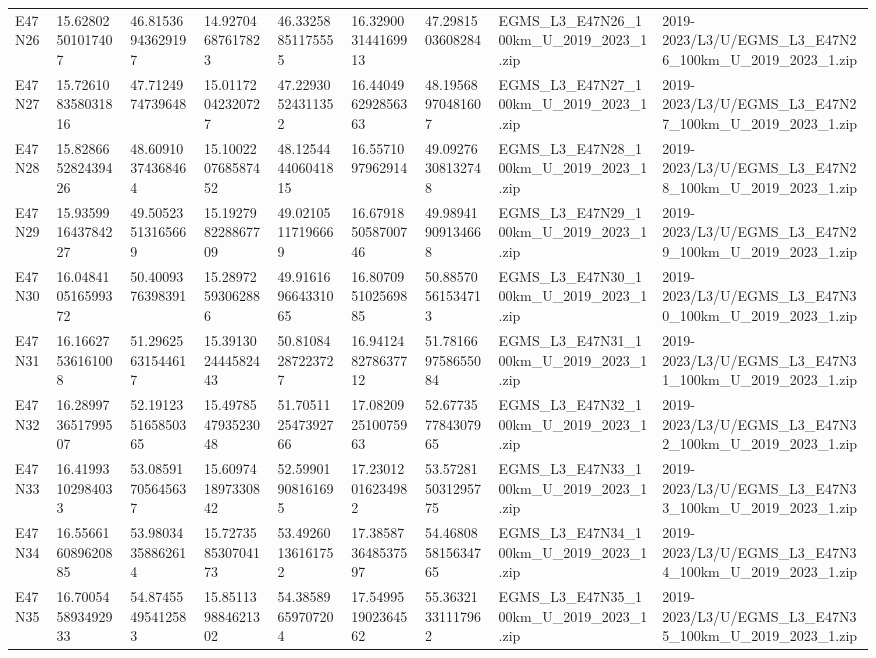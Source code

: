 \begin{landscape}
\begin{longtable}{lllllllll}
E47N26 & 15.62802501017407 & 46.81536943629197 & 14.92704687617823 & 46.33258851175555 & 16.329003144169913 & 47.2981503608284 & EGMS\_L3\_E47N26\_100km\_U\_2019\_2023\_1.zip & 2019-2023/L3/U/EGMS\_L3\_E47N26\_100km\_U\_2019\_2023\_1.zip \\
E47N27 & 15.726108358031816 & 47.7124974739648 & 15.01172042320727 & 47.22930524311352 & 16.440496292856363 & 48.19568970481607 & EGMS\_L3\_E47N27\_100km\_U\_2019\_2023\_1.zip & 2019-2023/L3/U/EGMS\_L3\_E47N27\_100km\_U\_2019\_2023\_1.zip \\
E47N28 & 15.828665282439426 & 48.60910374368464 & 15.100220768587452 & 48.125444406041815 & 16.5571097962914 & 49.09276308132748 & EGMS\_L3\_E47N28\_100km\_U\_2019\_2023\_1.zip & 2019-2023/L3/U/EGMS\_L3\_E47N28\_100km\_U\_2019\_2023\_1.zip \\
E47N29 & 15.935991643784227 & 49.50523513165669 & 15.192798228867709 & 49.02105117196669 & 16.679185058700746 & 49.98941909134668 & EGMS\_L3\_E47N29\_100km\_U\_2019\_2023\_1.zip & 2019-2023/L3/U/EGMS\_L3\_E47N29\_100km\_U\_2019\_2023\_1.zip \\
E47N30 & 16.048410516599372 & 50.4009376398391 & 15.28972593062886 & 49.916169664331065 & 16.807095102569885 & 50.88570561534713 & EGMS\_L3\_E47N30\_100km\_U\_2019\_2023\_1.zip & 2019-2023/L3/U/EGMS\_L3\_E47N30\_100km\_U\_2019\_2023\_1.zip \\
E47N31 & 16.16627536161008 & 51.29625631544617 & 15.391302444582443 & 50.81084287223727 & 16.941248278637712 & 51.781669758655084 & EGMS\_L3\_E47N31\_100km\_U\_2019\_2023\_1.zip & 2019-2023/L3/U/EGMS\_L3\_E47N31\_100km\_U\_2019\_2023\_1.zip \\
E47N32 & 16.289973651799507 & 52.191235165850365 & 15.497854793523048 & 51.705112547392766 & 17.082092510075963 & 52.677357784307965 & EGMS\_L3\_E47N32\_100km\_U\_2019\_2023\_1.zip & 2019-2023/L3/U/EGMS\_L3\_E47N32\_100km\_U\_2019\_2023\_1.zip \\
E47N33 & 16.41993102984033 & 53.08591705645637 & 15.609741897330842 & 52.59901908161695 & 17.23012016234982 & 53.572815031295775 & EGMS\_L3\_E47N33\_100km\_U\_2019\_2023\_1.zip & 2019-2023/L3/U/EGMS\_L3\_E47N33\_100km\_U\_2019\_2023\_1.zip \\
E47N34 & 16.556616089620885 & 53.98034358862614 & 15.727358530704173 & 53.49260136161752 & 17.385873648537597 & 54.468085815634765 & EGMS\_L3\_E47N34\_100km\_U\_2019\_2023\_1.zip & 2019-2023/L3/U/EGMS\_L3\_E47N34\_100km\_U\_2019\_2023\_1.zip \\
E47N35 & 16.700545893492933 & 54.87455495412583 & 15.851139884621302 & 54.38589659707204 & 17.549951902364562 & 55.36321331117962 & EGMS\_L3\_E47N35\_100km\_U\_2019\_2023\_1.zip & 2019-2023/L3/U/EGMS\_L3\_E47N35\_100km\_U\_2019\_2023\_1.zip \\

\end{longtable}
\end{landscape}
